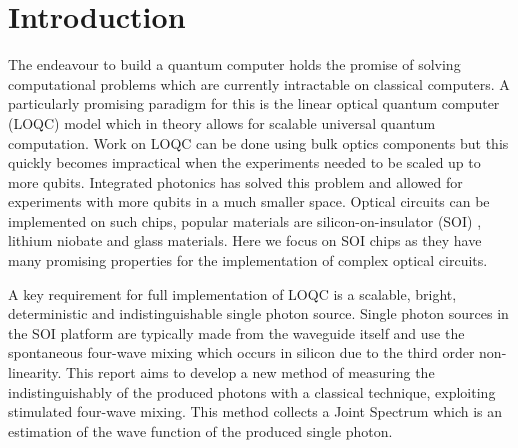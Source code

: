 \section{Introduction}
The endeavour to build a quantum computer holds the promise of solving computational problems which are currently intractable on classical computers. A particularly promising paradigm for this is the linear optical quantum computer (LOQC) model which in theory allows for scalable universal quantum computation. Work on LOQC can be done using bulk optics components but this quickly becomes impractical when the experiments needed to be scaled up to more qubits. Integrated photonics has solved this problem and allowed for experiments with more qubits in a much smaller space. Optical circuits can be implemented on such chips, popular materials are silicon-on-insulator (SOI) , lithium niobate and glass materials. Here we focus on SOI chips as they have many promising properties for the implementation of complex optical circuits.

A key requirement for full implementation of LOQC is a scalable, bright, deterministic and indistinguishable single photon source. Single photon sources in the SOI platform are typically made from the waveguide itself and use the spontaneous four-wave mixing which occurs in silicon due to the third order non-linearity. This report aims to develop a new method of measuring the indistinguishably of the produced photons with a classical technique, exploiting stimulated four-wave mixing. This method collects a Joint Spectrum which is an estimation of the wave function of the produced single photon. 

